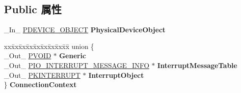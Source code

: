 \subsection*{Public 属性}
\begin{DoxyCompactItemize}
\item 
\mbox{\label{struct___i_o___c_o_n_n_e_c_t___i_n_t_e_r_r_u_p_t___m_e_s_s_a_g_e___b_a_s_e_d___p_a_r_a_m_e_t_e_r_s_a7014b8666633822481a6d525c19683b8}} 
\+\_\+\+In\+\_\+ \hyperlink{struct___d_e_v_i_c_e___o_b_j_e_c_t}{P\+D\+E\+V\+I\+C\+E\+\_\+\+O\+B\+J\+E\+CT} {\bfseries Physical\+Device\+Object}
\item 
\mbox{\label{struct___i_o___c_o_n_n_e_c_t___i_n_t_e_r_r_u_p_t___m_e_s_s_a_g_e___b_a_s_e_d___p_a_r_a_m_e_t_e_r_s_aaefc2ede319245cbc5faacd2c00f3e84}} 
\begin{tabbing}
xx\=xx\=xx\=xx\=xx\=xx\=xx\=xx\=xx\=\kill
union \{\\
\>\_Out\_ \hyperlink{interfacevoid}{PVOID} $\ast$ {\bfseries Generic}\\
\>\_Out\_ \hyperlink{struct___i_o___i_n_t_e_r_r_u_p_t___m_e_s_s_a_g_e___i_n_f_o}{PIO\_INTERRUPT\_MESSAGE\_INFO} $\ast$ {\bfseries InterruptMessageTable}\\
\>\_Out\_ \hyperlink{struct___k_i_n_t_e_r_r_u_p_t}{PKINTERRUPT} $\ast$ {\bfseries InterruptObject}\\
\} {\bfseries ConnectionContext}\\


\end{tabbing}
\end{DoxyCompactItemize}
